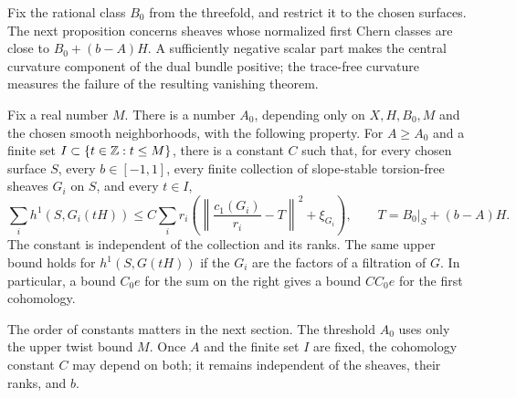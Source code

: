 Fix the rational class $B_0$ from the threefold, and restrict it to
the chosen surfaces.  The next proposition concerns sheaves whose
normalized first Chern classes are close to
$B_0+(b-A)H$.  A sufficiently negative scalar part makes the central
curvature component of the dual bundle positive; the trace-free curvature measures the
failure of the resulting vanishing theorem.

\begin{proposition}\label{prop:negative-surface-cohomology}
Fix a real number $M$.  There is a number $A_0$, depending only on
$X,H,B_0,M$ and the chosen smooth neighborhoods, with the following
property.  For $A\ge A_0$ and a finite set
$I\subset\{t\in\mathbb Z:t\le M\}$, there is a constant $C$ such that,
for every chosen surface $S$, every $b\in[-1,1]$, every finite
collection of slope-stable torsion-free sheaves $G_i$ on $S$, and
every $t\in I$,
\begin{equation}\label{eq:negative-surface-cohomology}
 \sum_i h^1(S,G_i(tH))
 \le C\sum_i r_i\left(
  \left\|\frac{c_1(G_i)}{r_i}-T\right\|^2+\xi_{G_i}\right),
 \qquad T=B_0|_S+(b-A)H.
\end{equation}
The constant is independent of the collection and its ranks.
The same upper bound holds for $h^1(S,G(tH))$ if the $G_i$ are
the factors of a filtration of $G$.
In particular, a bound $C_0e$ for the sum on the right gives a
bound $CC_0e$ for the first cohomology.
\end{proposition}

The order of constants matters in the next section.  The threshold
$A_0$ uses only the upper twist bound $M$.  Once $A$ and the finite
set $I$ are fixed, the cohomology constant $C$ may depend on both;
it remains independent of the sheaves, their ranks, and $b$.

